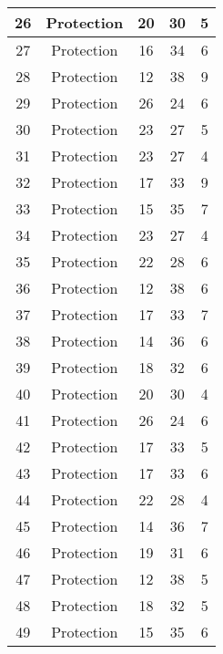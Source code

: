 \documentclass[results.tex]{subfiles}
\begin{document}
\begin{center}
\begin{tabular}{| c || c | c | c | c |}
    \hline
    26 & Protection & 20 & 30 & 5 \\ 
    \hline
    27 & Protection & 16 & 34 & 6 \\ 
    \hline
    28 & Protection & 12 & 38 & 9 \\ 
    \hline
    29 & Protection & 26 & 24 & 6 \\ 
    \hline
    30 & Protection & 23 & 27 & 5 \\ 
    \hline
    31 & Protection & 23 & 27 & 4 \\ 
    \hline
    32 & Protection & 17 & 33 & 9 \\ 
    \hline
    33 & Protection & 15 & 35 & 7 \\ 
    \hline
    34 & Protection & 23 & 27 & 4 \\ 
    \hline
    35 & Protection & 22 & 28 & 6 \\ 
    \hline
    36 & Protection & 12 & 38 & 6 \\ 
    \hline
    37 & Protection & 17 & 33 & 7 \\ 
    \hline
    38 & Protection & 14 & 36 & 6 \\ 
    \hline
    39 & Protection & 18 & 32 & 6 \\ 
    \hline
    40 & Protection & 20 & 30 & 4 \\ 
    \hline
    41 & Protection & 26 & 24 & 6 \\ 
    \hline
    42 & Protection & 17 & 33 & 5 \\ 
    \hline
    43 & Protection & 17 & 33 & 6 \\ 
    \hline
    44 & Protection & 22 & 28 & 4 \\ 
    \hline
    45 & Protection & 14 & 36 & 7 \\ 
    \hline
    46 & Protection & 19 & 31 & 6 \\ 
    \hline
    47 & Protection & 12 & 38 & 5 \\ 
    \hline
    48 & Protection & 18 & 32 & 5 \\ 
    \hline
    49 & Protection & 15 & 35 & 6 \\ 
    \hline   \end{tabular}
\end{center}
\end{document}
